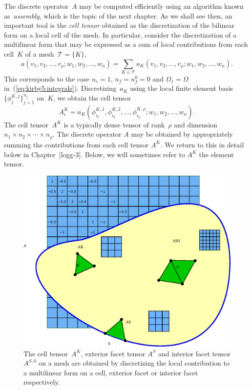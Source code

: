 The discrete operator~$A$ may be computed efficiently using an
algorithm known as~\emph{assembly}, which is the topic of the next
chapter. As we shall see then, an important tool is the \emph{cell
  tensor} obtained as the discretization of the bilinear form on a
local cell of the mesh. In particular, consider the discretization of
a multilinear form that may be expressed as a sum of local
contributions from each cell~$K$ of a mesh~$\mathcal{T} = \{K\}$,
\begin{displaymath}
  a(v_1, v_2, \ldots, v_{\rho}; w_1, w_2, \ldots, w_n)
  = \sum_{K\in\mathcal{T}} a_K(v_1, v_2, \ldots, v_{\rho}; w_1, w_2, \ldots, w_n).
\end{displaymath}
This corresponds to the case $n_c = 1$, $n_f = n_f^0 = 0$ and $\Omega_1
= \Omega$ in~(\ref{eq:kirby5:integrals}). Discretizing~$a_K$ using the
local finite element basis~$\{\phi^{K,j}_j\}_{j=1}^{n_j}$ on~$K$, we
obtain the cell tensor
\begin{equation} \label{eq:kirby5:celltensor}
  A^K_i
  = a_K(\phi^{K,1}_{i_1}, \phi^{K,2}_{i_2}, \ldots, \phi^{K,\rho}_{i_{\rho}}; w_1, w_2, \ldots, w_n).
\end{equation}
The cell tensor~$A^K$ is a typically dense tensor of rank~$\rho$ and
dimension $n_1 \times n_2 \times \cdots \times n_{\rho}$. The discrete
operator $A$ may be obtained by appropriately summing the
contributions from each cell tensor $A^K$. We return to this in detail
below in Chapter~[logg-3]. Below, we will sometimes refer to $A^K$ the
element tensor.

\begin{figure}
  \begin{center}
    \includegraphics[width=\largewidth]{chapters/kirby-5/eps/element_tensors.eps}
    \caption{The cell tensor~$A^K$, exterior facet tensor $A^S$ and
      interior facet tensor $A^{S,0}$ on a mesh are obtained by
      discretizing the local contribution to a multilinear form on a
      cell, exterior facet or interior facet
      respectively.}
    \label{fig:kirby5:tensors}
  \end{center}
\end{figure}

